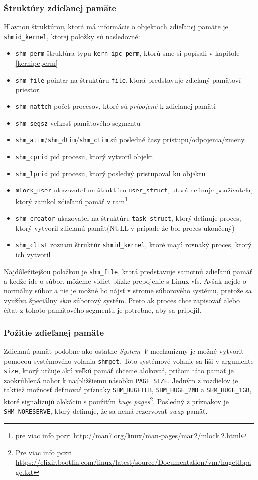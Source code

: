 \subsubsection{Štruktúry zdieľanej pamäte}
Hlavnou štruktúrou, ktorá má informácie o objektoch zdieľanej pamäte je \texttt{shmid\_kernel}, ktorej položky sú nasledovné:
\begin{itemize}
\item \texttt{shm\_perm} štruktúra typu \texttt{kern\_ipc\_perm}, ktorú sme si popísali v kapitole \ref{kernipcperm}
\item \texttt{shm\_file} pointer na štruktúru \texttt{file}, ktorá predstavuje zdieľaný pamäťoví priestor
\item \texttt{shm\_nattch} počet procesov, ktoré sú \textit{pripojené} k zdieľanej pamäti
\item \texttt{shm\_segsz} veľkosť pamäťového segmentu
\item \texttt{shm\_atim}/\texttt{shm\_dtim}/\texttt{shm\_ctim} sú posledné časy prístupu/odpojenia/zmeny
\item \texttt{shm\_cprid} \acrshort{pid} procesu, ktorý vytvoril objekt
\item \texttt{shm\_lprid} \acrshort{pid} procesu, ktorý posledný pristupoval ku objektu
\item \texttt{mlock\_user} ukazovateľ na štruktúru \texttt{user\_struct}, ktorá definuje používateľa, ktorý zamkol zdieľanú pamäť v \acrshort{ram}\footnote{pre viac info pozri \url{http://man7.org/linux/man-pages/man2/mlock.2.html}}
\item \texttt{shm\_creator} ukazovateľ na štruktúru \texttt{task\_struct}, ktorý definuje proces, ktorý vytvoril zdieľanú pamäť(NULL v prípade že bol proces ukončený)
\item \texttt{shm\_clist} zoznam štruktúr \texttt{shmid\_kernel}, ktoré majú rovnaký proces, ktorý ich vytvoril
\end{itemize}
Najdôležitejšou položkou je \texttt{shm\_file}, ktorá predstavuje samotnú zdieľanú pamäť a keďže ide o súbor, môžeme vidieť blízke prepojenie s Linux \acrshort{vfs}. Avšak nejde o normálny súbor a nie je možné ho nájsť v strome súborového systému, pretože sa využíva špeciálny \textit{shm} súborový systém.\cite{linux} Preto ak proces chce zapisovať alebo čítať z tohoto pamäťového segmentu je potrebne, aby sa pripojil.
\subsubsection{Požitie zdieľanej pamäte} \label{shmuse}
Zdieľanú pamäť podobne ako ostatne \textit{System V} mechanizmy je možné vytvoriť pomocou systémového volania \texttt{shmget}. Toto systémové volanie sa líši v argumente \texttt{size}, ktorý určuje akú veľkú pamäť chceme alokovať, pričom táto pamäť je zaokrúhlená nahor k najbližšiemu násobku \texttt{PAGE\_SIZE}. Jedným z rozdielov je taktiež možnosť definovať príznaky \texttt{SHM\_HUGETLB}, \texttt{SHM\_HUGE\_2MB} a \texttt{SHM\_HUGE\_1GB}, ktoré signalizujú alokáciu s použitím \textit{huge pages}\footnote{Pre viac info pozri \url{https://elixir.bootlin.com/linux/latest/source/Documentation/vm/hugetlbpage.txt}}. Posledný z príznakov je \texttt{SHM\_NORESERVE}, ktorý definuje, že sa nemá rezervovať \textit{swap} pamäť.

